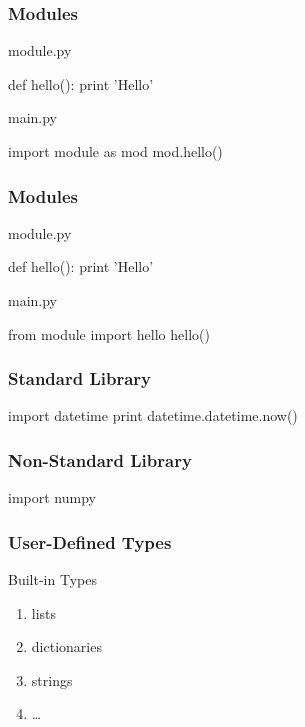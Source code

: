 \begin{frame}[fragile]
\frametitle{Modules}

\begin{block}{module.py}
\begin{python}
def hello():
    print 'Hello'
\end{python}
\end{block}

\begin{block}{main.py}
\begin{python}
import module as mod
mod.hello()
\end{python}
\end{block}

\end{frame}

\begin{frame}[fragile]
\frametitle{Modules}

\begin{block}{module.py}
\begin{python}
def hello():
    print 'Hello'
\end{python}
\end{block}

\begin{block}{main.py}
\begin{python}
from module import hello
hello()
\end{python}
\end{block}

\end{frame}

\begin{frame}[fragile]
\frametitle{Standard Library}
\begin{python}
import datetime
print datetime.datetime.now()
\end{python}
\end{frame}

\begin{frame}[fragile]
\frametitle{Non-Standard Library}
\begin{python}
import numpy
\end{python}
\end{frame}

\begin{frame}[fragile]
\frametitle{User-Defined Types}

\begin{block}{Built-in Types}
\begin{enumerate}
\item lists
\item dictionaries
\item strings
\item \ldots
\end{enumerate}
\end{block}
\end{frame}

